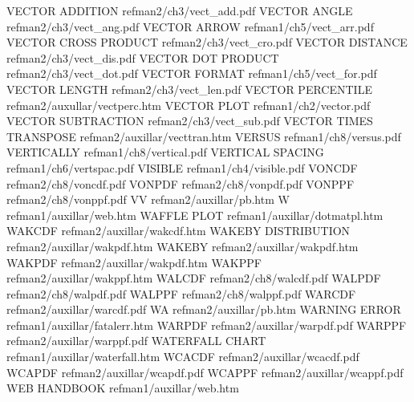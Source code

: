 VECTOR ADDITION                         refman2/ch3/vect_add.pdf
VECTOR ANGLE                            refman2/ch3/vect_ang.pdf
VECTOR ARROW                            refman1/ch5/vect_arr.pdf
VECTOR CROSS PRODUCT                    refman2/ch3/vect_cro.pdf
VECTOR DISTANCE                         refman2/ch3/vect_dis.pdf
VECTOR DOT PRODUCT                      refman2/ch3/vect_dot.pdf
VECTOR FORMAT                           refman1/ch5/vect_for.pdf
VECTOR LENGTH                           refman2/ch3/vect_len.pdf
VECTOR PERCENTILE                       refman2/auxullar/vectperc.htm
VECTOR PLOT                             refman1/ch2/vector.pdf
VECTOR SUBTRACTION                      refman2/ch3/vect_sub.pdf
VECTOR TIMES TRANSPOSE                  refman2/auxillar/vecttran.htm
VERSUS                                  refman1/ch8/versus.pdf
VERTICALLY                              refman1/ch8/vertical.pdf
VERTICAL SPACING                        refman1/ch6/vertspac.pdf
VISIBLE                                 refman1/ch4/visible.pdf
VONCDF                                  refman2/ch8/voncdf.pdf
VONPDF                                  refman2/ch8/vonpdf.pdf
VONPPF                                  refman2/ch8/vonppf.pdf
VV                                      refman2/auxillar/pb.htm
W                                       refman1/auxillar/web.htm
WAFFLE PLOT                             refman1/auxillar/dotmatpl.htm
WAKCDF                                  refman2/auxillar/wakcdf.htm
WAKEBY DISTRIBUTION                     refman2/auxillar/wakpdf.htm
WAKEBY                                  refman2/auxillar/wakpdf.htm
WAKPDF                                  refman2/auxillar/wakpdf.htm
WAKPPF                                  refman2/auxillar/wakppf.htm
WALCDF                                  refman2/ch8/walcdf.pdf
WALPDF                                  refman2/ch8/walpdf.pdf
WALPPF                                  refman2/ch8/walppf.pdf
WARCDF                                  refman2/auxillar/warcdf.pdf
WA                                      refman2/auxillar/pb.htm
WARNING ERROR                           refman1/auxillar/fatalerr.htm
WARPDF                                  refman2/auxillar/warpdf.pdf
WARPPF                                  refman2/auxillar/warppf.pdf
WATERFALL CHART                         refman1/auxillar/waterfall.htm
WCACDF                                  refman2/auxillar/wcacdf.pdf
WCAPDF                                  refman2/auxillar/wcapdf.pdf
WCAPPF                                  refman2/auxillar/wcappf.pdf
WEB HANDBOOK                            refman1/auxillar/web.htm
